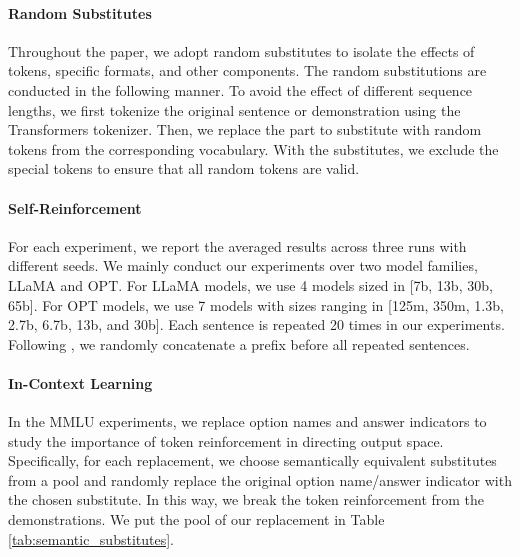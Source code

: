 \paragraph*{Random Substitutes}
Throughout the paper, we adopt random substitutes to isolate the effects of tokens, specific formats, and other components. The random substitutions are conducted in the following manner. 
To avoid the effect of different sequence lengths, we first tokenize the original sentence or demonstration using the Transformers tokenizer. Then, we replace the part to substitute with random tokens from the corresponding vocabulary. With the substitutes, we exclude the special tokens to ensure that all random tokens are valid. 

\paragraph*{Self-Reinforcement}
For each experiment, we report the averaged results across three runs with different seeds. 
We mainly conduct our experiments over two model families, LLaMA and OPT. For LLaMA models, we use 4 models sized in [7b, 13b, 30b, 65b]. 
For OPT models, we use 7 models with sizes ranging in [125m, 350m, 1.3b, 2.7b, 6.7b, 13b, and 30b].
Each sentence is repeated 20 times in our experiments.
Following \cite{xu2022learning}, we randomly concatenate a prefix before all repeated sentences. 

\paragraph{In-Context Learning}

In the MMLU experiments, we replace option names and answer indicators to study the importance of token reinforcement in directing output space. 
Specifically, for each replacement, we choose semantically equivalent substitutes from a pool and randomly replace the original option name/answer indicator with the chosen substitute. In this way, we break the token reinforcement from the demonstrations. 
We put the pool of our replacement in Table \ref{tab:semantic_substitutes}. 


